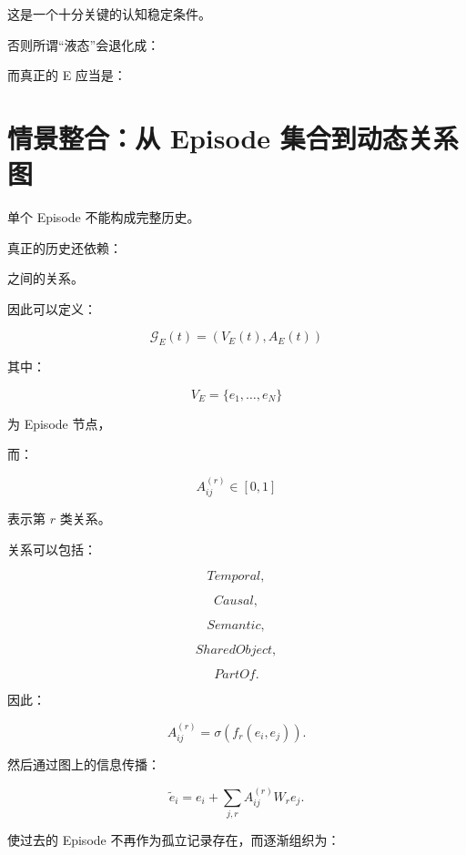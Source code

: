 这是一个十分关键的认知稳定条件。

否则所谓“液态”会退化成：

\begin{statementbox}
\centering
{}
\end{statementbox}

而真正的 E 应当是：

\begin{statementbox}
\centering
{}
\end{statementbox}


\section{情景整合：从 Episode 集合到动态关系图}

单个 Episode 不能构成完整历史。

真正的历史还依赖：

\begin{statementbox}
\centering
{}
\end{statementbox}

之间的关系。

因此可以定义：

\[
\boxed{
\mathcal G_E(t)
=
(
V_E(t),
A_E(t)
)
}
\]

其中：

\[
V_E
=
\{
e_1,\ldots,e_N
\}
\]

为 Episode 节点，

而：

\[
A_{ij}^{(r)}
\in[0,1]
\]

表示第 \(r\) 类关系。

关系可以包括：

\[
Temporal,
\]

\[
Causal,
\]

\[
Semantic,
\]

\[
SharedObject,
\]

\[
PartOf.
\]

因此：

\[
\boxed{
A_{ij}^{(r)}
=
\sigma
\left(
f_r(e_i,e_j)
\right).
}
\]

然后通过图上的信息传播：

\[
\boxed{
\tilde e_i
=
e_i
+
\sum_{j,r}
A_{ij}^{(r)}
W_r e_j.
}
\]

使过去的 Episode 不再作为孤立记录存在，而逐渐组织为：

